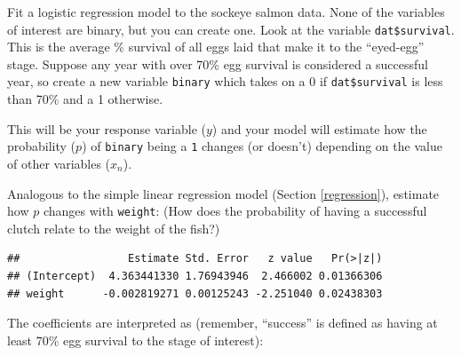 \documentclass[]{book}
\newenvironment{Shaded}{\begin{snugshade}}{\end{snugshade}}
\newcommand{\KeywordTok}[1]{\textcolor[rgb]{0.13,0.29,0.53}{\textbf{#1}}}
\newcommand{\DataTypeTok}[1]{\textcolor[rgb]{0.13,0.29,0.53}{#1}}
\newcommand{\DecValTok}[1]{\textcolor[rgb]{0.00,0.00,0.81}{#1}}
\newcommand{\StringTok}[1]{\textcolor[rgb]{0.31,0.60,0.02}{#1}}
\newcommand{\OperatorTok}[1]{\textcolor[rgb]{0.81,0.36,0.00}{\textbf{#1}}}
\newcommand{\NormalTok}[1]{#1}
\theoremstyle{definition}
\theoremstyle{definition}
\theoremstyle{definition}
\theoremstyle{remark}
\begin{document}
Fit a logistic regression model to the sockeye salmon data. None of the
variables of interest are binary, but you can create one. Look at the
variable \texttt{dat\$survival}. This is the average \% survival of all
eggs laid that make it to the ``eyed-egg'' stage. Suppose any year with
over 70\% egg survival is considered a successful year, so create a new
variable \texttt{binary} which takes on a 0 if \texttt{dat\$survival} is
less than 70\% and a 1 otherwise.

\begin{Shaded}
\end{Shaded}

This will be your response variable (\(y\)) and your model will estimate
how the probability (\(p\)) of \texttt{binary} being a \texttt{1}
changes (or doesn't) depending on the value of other variables
(\(x_{n}\)).

Analogous to the simple linear regression model (Section
\ref{regression}), estimate how \(p\) changes with \texttt{weight}: (How
does the probability of having a successful clutch relate to the weight
of the fish?)

\begin{Shaded}
\end{Shaded}

\begin{verbatim}
##                 Estimate Std. Error   z value   Pr(>|z|)
## (Intercept)  4.363441330 1.76943946  2.466002 0.01366306
## weight      -0.002819271 0.00125243 -2.251040 0.02438303
\end{verbatim}

The coefficients are interpreted as (remember, ``success'' is defined as
having at least 70\% egg survival to the stage of interest):
\end{document}
